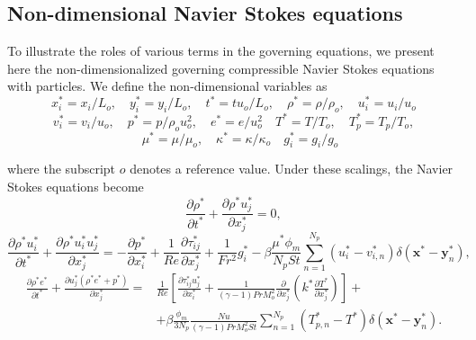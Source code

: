 \documentclass[a4paper,10pt]{report}
\begin{document}
\subsection*{Non-dimensional Navier Stokes equations}

To illustrate the roles of various terms in the governing equations, we present here the non-dimensionalized governing compressible Navier Stokes equations with particles. We define the non-dimensional variables as
\begin{equation}
x_i^*=x_i/L_o, \quad y_i^*=y_i/L_o, \quad t^*=tu_o/L_o, \quad \rho^*=\rho/\rho_o, \quad u_i^*=u_i/u_o	
\end{equation}
\begin{equation}
v_i^*=v_i/u_o, \quad p^*=p/\rho_o u_o^2, \quad e^*=e/u_o^2 \quad T^*=T/T_o, \quad T_p^* = T_p / T_o, 
\end{equation}
\begin{equation}
\quad \mu^* = \mu / \mu_o, \quad \kappa^* = \kappa / \kappa_o \quad g^*_i = g_i / g_o	
\end{equation}

where the subscript $o$ denotes a reference value. Under these scalings, the Navier Stokes equations become
\begin{equation}
\label{eq:NS_cont_nd}
\frac{\partial \rho^*}{\partial t^*} + \frac{\partial \rho^* u_j^*}{\partial x_j^*} = 0,	
\end{equation}
\begin{equation}
\label{eq:NS_mom_nd}
\frac{\partial \rho^* u_i^*}{\partial t^*} + \frac{\partial \rho^* u_i^* u_j^*}{\partial x_j^*} = - \frac{\partial p^*}{\partial x_i^*} + \frac{1}{Re}\frac{\partial \tau_{ij}^*}{\partial x_j^*} + \frac{1}{Fr^2} g_i^* - \beta\frac{\mu^* \phi_m}{N_p St}  \sum_{n=1}^{N_p} (u_i^*-v_{i,n}^*)\delta(\mathbf{x}^* - \mathbf{y}_n^* ),	
\end{equation}
\begin{equation}
\label{eq:NS_en_nd}
\begin{split}
\frac{\partial \rho^* e^*}{\partial t^*} + \frac{\partial u_j^* (\rho^* e^* + p^*)}{\partial x_j^*} = & \frac{1}{Re}\left[\frac{\partial \tau_{ij}^* u_j^*}{\partial x_i^*} + \frac{1}{(\gamma-1)Pr M_o^2}\frac{\partial}{\partial x_j^*}\left( k^* \frac{\partial T^*}{\partial x_j^*}\right)\right]+ \\
& + \beta \frac{\phi_m}{3N_p} \frac{Nu}{(\gamma-1)Pr M_o^2St}\sum_{n=1}^{N_p} (T_{p,n}^* - T^*) \delta(\mathbf{x}^* - \mathbf{y}_n^* ).
\end{split}
\end{equation}
\end{document}
